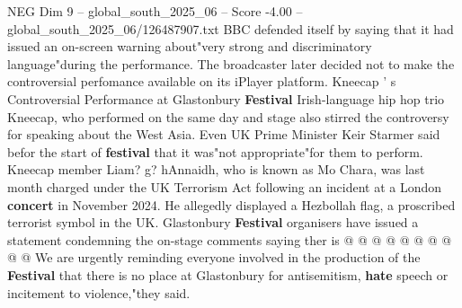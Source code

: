 \begin{textsample}{NEG Dim 9 – global\_south\_2025\_06 – Score -4.00 – global\_south\_2025\_06/126487907.txt}
BBC defended itself by saying that it had issued an on-screen warning about"very strong and discriminatory language"during the performance.
The broadcaster later decided not to make the controversial perfomance available on its iPlayer platform.
Kneecap ' s Controversial Performance at Glastonbury \textbf{Festival} Irish-language hip hop trio Kneecap, who performed on the same day and stage also stirred the controversy for speaking about the West Asia.
Even UK Prime Minister Keir Starmer said befor the start of \textbf{festival} that it was"not appropriate"for them to perform.
Kneecap member Liam? g? hAnnaidh, who is known as Mo Chara, was last month charged under the UK Terrorism Act following an incident at a London \textbf{concert} in November 2024.
He allegedly displayed a Hezbollah flag, a proscribed terrorist symbol in the UK.
Glastonbury \textbf{Festival} organisers have issued a statement condemning the on-stage comments saying ther is @ @ @ @ @ @ @ @ @ @ We are urgently reminding everyone involved in the production of the \textbf{Festival} that there is no place at Glastonbury for antisemitism, \textbf{hate} speech or incitement to violence,"they said.

\end{textsample}

